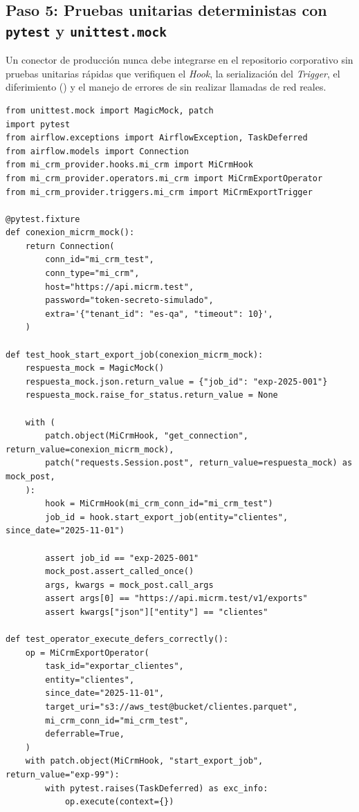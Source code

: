 \subsection{Paso 5: Pruebas unitarias deterministas con \texttt{pytest} y \texttt{unittest.mock}}

Un conector de producción nunca debe integrarse en el repositorio corporativo sin pruebas unitarias rápidas que verifiquen el \textit{Hook}, la serialización del \textit{Trigger}, el diferimiento () y el manejo de errores de  sin realizar llamadas de red reales.

\begin{lstlisting}[style=python, caption={Suite de pruebas unitarias para \texttt{MiCrmHook} y \texttt{MiCrmExportOperator} (\texttt{tests/test\_mi\_crm\_provider.py}).}, label={lst:custom-tests}]
from unittest.mock import MagicMock, patch
import pytest
from airflow.exceptions import AirflowException, TaskDeferred
from airflow.models import Connection
from mi_crm_provider.hooks.mi_crm import MiCrmHook
from mi_crm_provider.operators.mi_crm import MiCrmExportOperator
from mi_crm_provider.triggers.mi_crm import MiCrmExportTrigger

@pytest.fixture
def conexion_micrm_mock():
    return Connection(
        conn_id="mi_crm_test",
        conn_type="mi_crm",
        host="https://api.micrm.test",
        password="token-secreto-simulado",
        extra='{"tenant_id": "es-qa", "timeout": 10}',
    )

def test_hook_start_export_job(conexion_micrm_mock):
    respuesta_mock = MagicMock()
    respuesta_mock.json.return_value = {"job_id": "exp-2025-001"}
    respuesta_mock.raise_for_status.return_value = None

    with (
        patch.object(MiCrmHook, "get_connection", return_value=conexion_micrm_mock),
        patch("requests.Session.post", return_value=respuesta_mock) as mock_post,
    ):
        hook = MiCrmHook(mi_crm_conn_id="mi_crm_test")
        job_id = hook.start_export_job(entity="clientes", since_date="2025-11-01")

        assert job_id == "exp-2025-001"
        mock_post.assert_called_once()
        args, kwargs = mock_post.call_args
        assert args[0] == "https://api.micrm.test/v1/exports"
        assert kwargs["json"]["entity"] == "clientes"

def test_operator_execute_defers_correctly():
    op = MiCrmExportOperator(
        task_id="exportar_clientes",
        entity="clientes",
        since_date="2025-11-01",
        target_uri="s3://aws_test@bucket/clientes.parquet",
        mi_crm_conn_id="mi_crm_test",
        deferrable=True,
    )
    with patch.object(MiCrmHook, "start_export_job", return_value="exp-99"):
        with pytest.raises(TaskDeferred) as exc_info:
            op.execute(context={})


\end{lstlisting}
